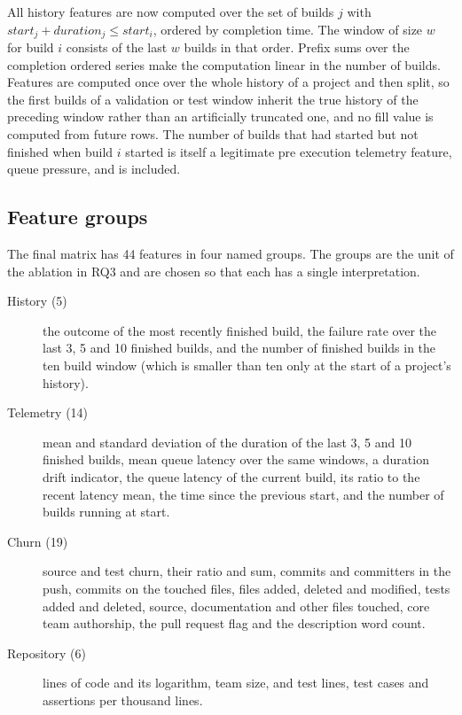 \documentclass[sigconf,review,anonymous,nonacm]{acmart}
\begin{document}
All history features are now computed over the set of builds $j$ with $\mathit{start}_j + \mathit{duration}_j \le \mathit{start}_i$, ordered by completion time. The window of size $w$ for build $i$ consists of the last $w$ builds in that order. Prefix sums over the completion ordered series make the computation linear in the number of builds. Features are computed once over the whole history of a project and then split, so the first builds of a validation or test window inherit the true history of the preceding window rather than an artificially truncated one, and no fill value is computed from future rows. The number of builds that had started but not finished when build $i$ started is itself a legitimate pre execution telemetry feature, queue pressure, and is included.


\subsection{Feature groups}
\label{sec:design-features}

The final matrix has 44 features in four named groups. The groups are the unit of the ablation in RQ3 and are chosen so that each has a single interpretation.

\begin{description}
  \item[History (5)] the outcome of the most recently finished build, the failure rate over the last 3, 5 and 10 finished builds, and the number of finished builds in the ten build window (which is smaller than ten only at the start of a project's history).
  \item[Telemetry (14)] mean and standard deviation of the duration of the last 3, 5 and 10 finished builds, mean queue latency over the same windows, a duration drift indicator, the queue latency of the current build, its ratio to the recent latency mean, the time since the previous start, and the number of builds running at start.
  \item[Churn (19)] source and test churn, their ratio and sum, commits and committers in the push, commits on the touched files, files added, deleted and modified, tests added and deleted, source, documentation and other files touched, core team authorship, the pull request flag and the description word count.
  \item[Repository (6)] lines of code and its logarithm, team size, and test lines, test cases and assertions per thousand lines.
\end{description}
\end{document}
